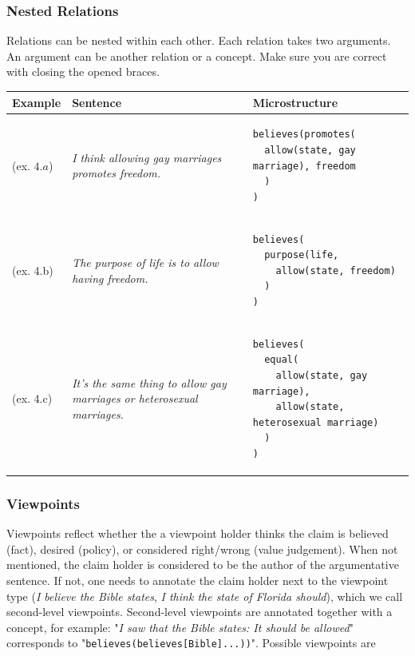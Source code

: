 \subsubsection{Nested Relations}

Relations can be nested within each other. Each relation takes two arguments.
An argument can be another relation or a concept. Make sure you are correct
with closing the opened braces. 

\begin{footnotesize}
\begin{tabular}{@{}m{1.5cm} m{5cm} m{8cm}}
\toprule
Example & Sentence & Microstructure \\
\midrule
(ex. $4.a$) & \textit{I think allowing gay marriages promotes freedom. } & 
\begin{verbatim}
believes(promotes(
  allow(state, gay marriage), freedom
  )
)
\end{verbatim}
\\
(ex. 4.b) & \textit{The purpose of life is to allow having freedom.} 
 &
\begin{verbatim}
believes(
  purpose(life, 
    allow(state, freedom)
  )
)
\end{verbatim} 
\\
(ex. 4.c) & \textit{It’s the same thing to allow gay marriages or heterosexual marriages.} & 
\begin{verbatim}
believes(
  equal(
    allow(state, gay marriage), 
    allow(state, heterosexual marriage)
  )
)
\end{verbatim}
\\
\bottomrule
\end{tabular}
\end{footnotesize}

\subsubsection{Viewpoints}

Viewpoints reflect whether the a viewpoint holder thinks the claim is believed
(fact), desired (policy), or considered right/wrong (value judgement). When not
mentioned, the claim holder is considered to be the author of the argumentative
sentence. If not, one needs to annotate the claim holder next to the viewpoint
type (\textit{I believe the Bible states}, \textit{I think the state of Florida should}), which
we call second-level viewpoints. Second-level viewpoints are annotated together
with a concept, for example: "\textit{I saw that the Bible states: It should be
allowed}" corresponds to "\texttt{believes(believes[Bible]...))}".
Possible viewpoints are \\

